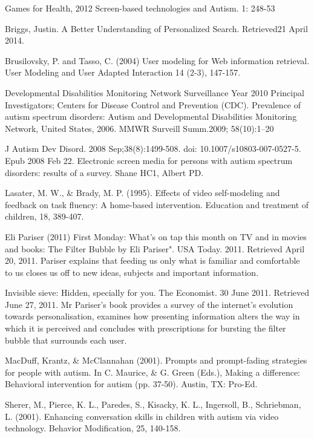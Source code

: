 \documentclass[11pt]{article}
\begin{document}
\begin{thebibliography}{100}

 Games for Health, 2012 Screen-based technologies and Autism. 1: 248-53


Briggs, Justin. A Better Understanding of Personalized Search. Retrieved21 April 2014.


Brusilovsky, P. and Tasso, C. (2004) User modeling for Web information retrieval. User Modeling and User Adapted Interaction 14 (2-3), 147-157.


Developmental Disabilities Monitoring Network Surveillance Year 2010 Principal Investigators; Centers for Disease Control and Prevention (CDC). Prevalence of autism spectrum disorders: Autism and Developmental Disabilities Monitoring Network, United States, 2006. MMWR Surveill Summ.2009; 58(10):1–20


J Autism Dev Disord. 2008 Sep;38(8):1499-508. doi: 10.1007/s10803-007-0527-5. Epub 2008 Feb 22.
Electronic screen media for persons with autism spectrum disorders: results of a survey.
Shane HC1, Albert PD.


Lasater, M. W., \& Brady, M. P. (1995). Effects of video self-modeling and feedback on task fluency: A home-based intervention. Education and treatment of children, 18, 389-407.


Eli Pariser (2011) First Monday: What's on tap this month on TV and in movies and books: The Filter Bubble by Eli Pariser". USA Today. 2011. Retrieved April 20, 2011. Pariser explains that feeding us only what is familiar and comfortable to us closes us off to new ideas, subjects and important information.


 Invisible sieve: Hidden, specially for you. The Economist. 30 June 2011. Retrieved June 27, 2011. Mr Pariser’s book provides a survey of the internet’s evolution towards personalisation, examines how presenting information alters the way in which it is perceived and concludes with prescriptions for bursting the filter bubble that surrounds each user.

 MacDuff, Krantz, \& McClannahan (2001). Prompts and prompt-fading strategies for people with autism. In C. Maurice, \& G. Green (Eds.), Making a difference: Behavioral intervention for autism (pp. 37-50). Austin, TX: Pro-Ed.


Sherer, M., Pierce, K. L., Paredes, S., Kisacky, K. L., Ingersoll, B., Schriebman, L. (2001). Enhancing conversation skills in children with autism via video technology. Behavior Modification, 25, 140-158.



\end{thebibliography}
\end{document}
